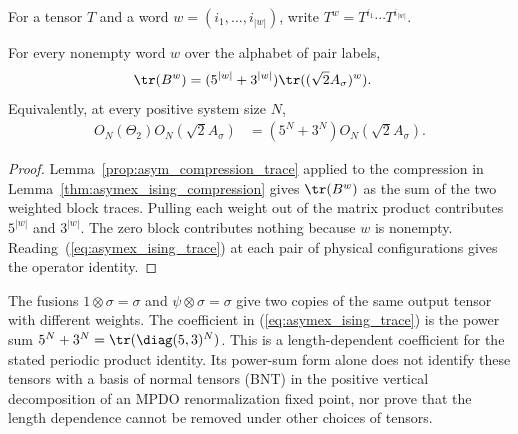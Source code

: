 For a tensor $T$ and a word $w=(i_1,\ldots,i_{|w|})$, write
$T^w=T^{i_1}\cdots T^{i_{|w|}}$.

\begin{lemma}%
    \label{thm:asymex_ising_trace}
    \leanok
    For every nonempty word $w$ over the alphabet of pair labels,
    \begin{align}
        \tr(B^w) & =(5^{|w|}+3^{|w|})\tr((\sqrt2A_\sigma)^w).
        \label{eq:asymex_ising_trace}
    \end{align}
    Equivalently, at every positive system size $N$,
    \begin{align}
        O_N(\Theta_2)O_N(\sqrt2A_\sigma)
         & =(5^N+3^N)O_N(\sqrt2A_\sigma).
    \end{align}
\end{lemma}

\begin{proof}
    \leanok
    Lemma~\ref{prop:asym_compression_trace} applied to the
    compression in Lemma~\ref{thm:asymex_ising_compression} gives
    $\tr(B^w)$ as the sum of the two weighted block traces.
    Pulling each weight out of the matrix product contributes
    $5^{|w|}$ and $3^{|w|}$. The zero block contributes nothing because
    $w$ is nonempty. Reading~(\ref{eq:asymex_ising_trace}) at each pair
    of physical configurations gives the operator identity.
\end{proof}

\begin{remark}%
    \label{rem:asymex_ising_hidden_channel}
    The fusions $1\otimes\sigma=\sigma$ and
    $\psi\otimes\sigma=\sigma$ give two copies of the same output tensor
    with different weights. The coefficient in
    (\ref{eq:asymex_ising_trace}) is the power sum
    $5^N+3^N=\tr(\diag(5,3)^N)$.
    This is a length-dependent coefficient for the stated periodic
    product identity. Its power-sum form alone does not identify these
    tensors with a basis of normal tensors (BNT) in the positive vertical
    decomposition of an MPDO renormalization fixed point, nor prove that
    the length dependence cannot be removed under other choices of tensors.
\end{remark}

